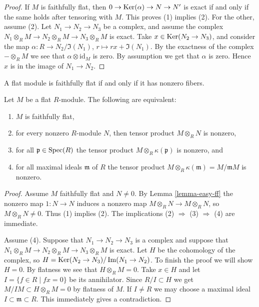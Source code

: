 \begin{proof}
	If $M$ is faithfully flat, then
	$0 \to \mathop{\mathrm{Ker}}(\alpha) \to N \to N'$ is exact if and only if the same holds
	after tensoring with $M$. This proves (1) implies (2).
	For the other, assume (2). Let $N_1 \to N_2 \to N_3$
	be a complex, and assume the complex
	$N_1 \otimes_R M \to N_2 \otimes_R M \to N_3\otimes_R M$
	is exact. Take $x \in \mathop{\mathrm{Ker}}(N_2 \to N_3)$,
	and consider the map $\alpha : R \to N_2/\Im(N_1)$,
	$r \mapsto rx + \Im(N_1)$. By the exactness
	of the complex $-\otimes_R M$ we see that $\alpha \otimes
	\text{id}_M$ is zero. By assumption we get that $\alpha$ is
	zero. Hence $x $ is in the image of $N_1 \to N_2$.
\end{proof}

\begin{lemma}
	\label{lemma-ff}
	\begin{slogan}
		A flat module is faithfully flat if and only if it has nonzero fibers.
	\end{slogan}
	Let $M$ be a flat $R$-module.
	The following are equivalent:
	\begin{enumerate}
		\item $M$ is faithfully flat,
		\item for every nonzero $R$-module $N$, then tensor product $M \otimes_R N$
		is nonzero,
		\item for all $\mathfrak p \in \mathop{\mathrm{Spec}}(R)$
		the tensor product $M \otimes_R \kappa(\mathfrak p)$ is nonzero, and
		\item for all maximal ideals $\mathfrak m$ of $R$
		the tensor product $M \otimes_R \kappa(\mathfrak m) = M/{\mathfrak m}M$
		is nonzero.
	\end{enumerate}
\end{lemma}

\begin{proof}
	Assume $M$ faithfully flat and $N \not = 0$. By Lemma \ref{lemma-easy-ff}
	the nonzero map $1 : N \to N$ induces a nonzero map
	$M \otimes_R N \to M \otimes_R N$, so $M \otimes_R N \not = 0$.
	Thus (1) implies (2). The implications (2) $\Rightarrow$ (3) $\Rightarrow$ (4)
	are immediate.
	
	\medskip\noindent
	Assume (4). Suppose that $N_1 \to N_2 \to N_3$ is a complex and
	suppose that $N_1 \otimes_R M \to N_2\otimes_R M \to
	N_3\otimes_R M$ is exact. Let $H$ be the cohomology of the complex,
	so $H = \mathop{\mathrm{Ker}}(N_2 \to N_3)/\mathop{\mathrm{Im}}(N_1 \to N_2)$. To finish the proof
	we will show $H = 0$. By flatness we see that $H \otimes_R M = 0$.
	Take $x \in H$ and let $I = \{f \in R \mid fx = 0 \}$
	be its annihilator. Since $R/I \subset H$ we get
	$M/IM \subset H \otimes_R M = 0$ by flatness of $M$.
	If $I \not =  R$ we may choose
	a maximal ideal $I \subset \mathfrak m \subset R$.
	This immediately gives a contradiction.
\end{proof}


